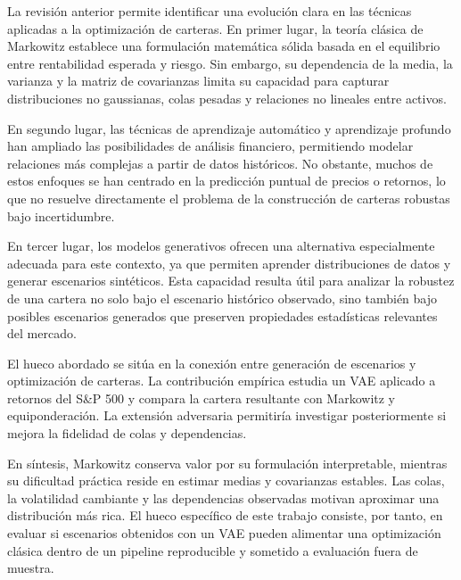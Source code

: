 La revisión anterior permite identificar una evolución clara en las técnicas aplicadas a la optimización de carteras. En primer lugar, la teoría clásica de Markowitz establece una formulación matemática sólida basada en el equilibrio entre rentabilidad esperada y riesgo. Sin embargo, su dependencia de la media, la varianza y la matriz de covarianzas limita su capacidad para capturar distribuciones no gaussianas, colas pesadas y relaciones no lineales entre activos.

En segundo lugar, las técnicas de aprendizaje automático y aprendizaje profundo han ampliado las posibilidades de análisis financiero, permitiendo modelar relaciones más complejas a partir de datos históricos. No obstante, muchos de estos enfoques se han centrado en la predicción puntual de precios o retornos, lo que no resuelve directamente el problema de la construcción de carteras robustas bajo incertidumbre.

En tercer lugar, los modelos generativos ofrecen una alternativa especialmente adecuada para este contexto, ya que permiten aprender distribuciones de datos y generar escenarios sintéticos. Esta capacidad resulta útil para analizar la robustez de una cartera no solo bajo el escenario histórico observado, sino también bajo posibles escenarios generados que preserven propiedades estadísticas relevantes del mercado.

El hueco abordado se sitúa en la conexión entre generación de escenarios y optimización de carteras. La contribución empírica estudia un VAE aplicado a retornos del S\&P 500 y compara la cartera resultante con Markowitz y equiponderación. La extensión adversaria permitiría investigar posteriormente si mejora la fidelidad de colas y dependencias.

En síntesis, Markowitz conserva valor por su formulación interpretable, mientras su dificultad práctica reside en estimar medias y covarianzas estables. Las colas, la volatilidad cambiante y las dependencias observadas motivan aproximar una distribución más rica. El hueco específico de este trabajo consiste, por tanto, en evaluar si escenarios obtenidos con un VAE pueden alimentar una optimización clásica dentro de un pipeline reproducible y sometido a evaluación fuera de muestra.
